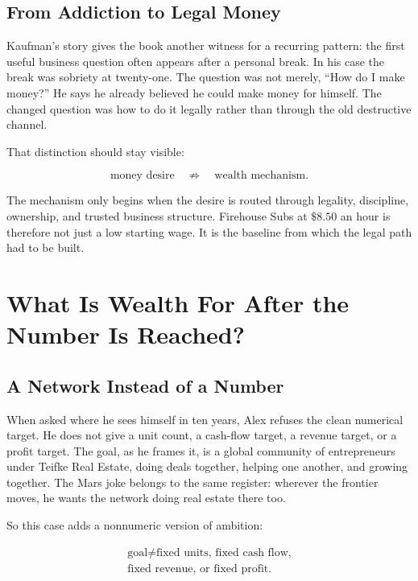 \documentclass[11pt,oneside]{book}
\begin{document}
\section{From Addiction to Legal Money}

Kaufman's story gives the book another witness for a recurring pattern: the first useful business question often appears after a personal break. In his case the break was sobriety at twenty-one. The question was not merely, ``How do I make money?'' He says he already believed he could make money for himself. The changed question was how to do it legally rather than through the old destructive channel.

That distinction should stay visible:

\begin{equation}
\text{money desire}
\quad \not\Rightarrow \quad
\text{wealth mechanism}.
\end{equation}

The mechanism only begins when the desire is routed through legality, discipline, ownership, and trusted business structure. Firehouse Subs at \(\$8.50\) an hour is therefore not just a low starting wage. It is the baseline from which the legal path had to be built.

\chapter{What Is Wealth For After the Number Is Reached?}

\section{A Network Instead of a Number}

When asked where he sees himself in ten years, Alex refuses the clean numerical target. He does not give a unit count, a cash-flow target, a revenue target, or a profit target. The goal, as he frames it, is a global community of entrepreneurs under Teifke Real Estate, doing deals together, helping one another, and growing together. The Mars joke belongs to the same register: wherever the frontier moves, he wants the network doing real estate there too.

So this case adds a nonnumeric version of ambition:

\begin{equation}
\begin{gathered}
\text{goal}\neq\text{fixed units, fixed cash flow,}\\
\text{fixed revenue, or fixed profit}.
\end{gathered}
\end{equation}
\end{document}
